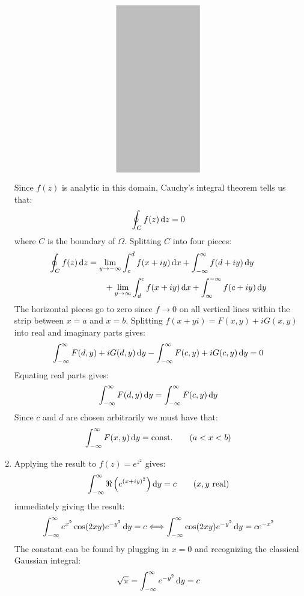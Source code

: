 \begin{solution}
\begin{enumerate}[label=(\alph*)]
\[\begin{tikzpicture}
\begin{scope}[scale=0.7]
            \path [draw=none,fill=gray,semitransparent] (-3, -5) rectangle (2, 5);
            \end{scope}
        \end{tikzpicture}\]
        Since $f(z)$ is analytic in this domain, Cauchy's integral theorem tells us that:
        \[
            \oint_{C} f(z) \mathop{}\!\mathrm{d} z = 0
        \]
        where $C$ is the boundary of $\Omega$. Splitting $C$ into four pieces:
        \begin{align*}
            \oint_C f(z) \mathop{}\!\mathrm{d} z &= \lim_{y\to-\infty}\int_{c}^{d} f(x+iy) \mathop{}\!\mathrm{d} x+ \int_{-\infty}^\infty f(d+iy) \mathop{}\!\mathrm{d} y  \\
            &\mspace{35mu} + \lim_{y\to\infty} \int_{d}^c f(x+iy) \mathop{}\!\mathrm{d} x + \int_{\infty}^{-\infty} f(c+iy) \mathop{}\!\mathrm{d} y
        \end{align*}
        The horizontal pieces go to zero since $f\to 0$ on all vertical lines within the strip between $x=a$ and $x=b$. Splitting $f(x+yi) = F(x, y) + iG(x, y)$ into real and imaginary parts gives:
        \[
            \int_{-\infty}^{\infty} F(d, y) + iG(d, y) \mathop{}\!\mathrm{d} y - \int_{-\infty}^{\infty} F(c, y) + iG(c, y) \mathop{}\!\mathrm{d} y = 0
        \]
        Equating real parts gives:
        \[
            \int_{-\infty}^{\infty} F(d, y) \mathop{}\!\mathrm{d} y = \int_{-\infty}^{\infty} F(c, y) \mathop{}\!\mathrm{d} y
        \]
        Since $c$ and $d$ are chosen arbitrarily we must have that:
        \[
            \int_{-\infty}^{\infty} F(x,y) \mathop{}\!\mathrm{d} y = \textnormal{const.} \qquad (a < x < b)
        \]
        \item Applying the result to $f(z) = e^{z^2}$ gives:
        \[
            \int_{-\infty}^{\infty} \Re\left( e^{(x+iy)^2} \right)\mathop{}\!\mathrm{d} y = c \qquad (x,y \textnormal{ real})
        \]
        immediately giving the result:
        \[
            \int_{-\infty}^\infty e^{x^2}\cos(2xy)e^{-y^2} \mathop{}\!\mathrm{d} y = c \Longleftrightarrow  \int_{-\infty}^\infty \cos(2xy)e^{-y^2} \mathop{}\!\mathrm{d} y = ce^{-x^2}
        \]
        The constant can be found by plugging in $x=0$ and recognizing the classical Gaussian integral:
        \[
            \sqrt{\pi} = \int_{-\infty}^\infty e^{-y^2} \mathop{}\!\mathrm{d} y = c
        \]
    \end{enumerate}
\end{solution}

